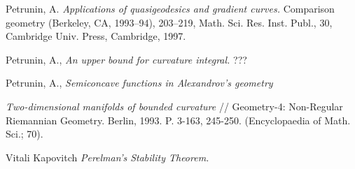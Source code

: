 \documentclass[a4paper,10pt]{article}
\begin{document}
\begin{thebibliography}{52}
 Petrunin, A. \textit{Applications of quasigeodesics and gradient curves.} Comparison geometry (Berkeley, CA, 1993–94), 203--219, Math. Sci. Res. Inst. Publ., 30, Cambridge Univ. Press, Cambridge, 1997.

 Petrunin, A., \textit{An upper bound for curvature integral.} ???

 Petrunin, A., \textit{Semiconcave functions in Alexandrov's geometry}

 \textit{ Two-dimensional manifolds of bounded curvature} // Geometry-4: Non-Regular Riemannian Geometry. Berlin, 1993. P. 3-163, 245-250. (Encyclopaedia of Math. Sci.; 70). 

Vitali Kapovitch \textit{Perelman's Stability Theorem.}
\end{thebibliography}
\end{document}
